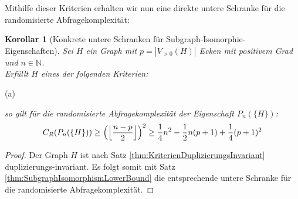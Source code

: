 \documentclass[a4paper]{scrreprt}
\newtheorem{corollary}[definition]{Korollar}
\theoremstyle{definition}
\begin{document}
Mithilfe dieser Kriterien erhalten wir nun
eine direkte untere Schranke für die randomisierte Abfragekomplexität:
\begin{corollary}[Konkrete untere Schranken für Subgraph-Isomorphie-Eigenschaften]
Sei $H$ ein Graph mit $p=|V_{>0}(H)|$ Ecken mit positivem Grad
und $n\in \mathbb{N}$. \\
Erfüllt $H$ eines der folgenden Kriterien:
\begin{description}
\item[(a)]
\end{description}
so gilt für die randomisierte Abfragekomplexität der Eigenschaft 
$P_n(\{H\})$:
$$ C_R(P_n(\{H\})) \geq
\Big{ ( } \Big \lfloor  \frac{n-p}{2} \Big \rfloor \Big{)}^{2} \geq
\frac{1}{4}n^2 - \frac{1}{2}n(p+1) + \frac{1}{4}(p+1)^2
$$
\end{corollary}
\begin{proof}
Der Graph $H$ ist nach Satz \ref{thm:KriterienDuplizierungsInvariant}
duplizierungs-invariant. Es folgt somit mit 
Satz \ref{thm:SubgraphIsomorphismLowerBound} die entsprechende
untere Schranke für die randomisierte Abfragekomplexität.
\end{proof}
\end{document}
